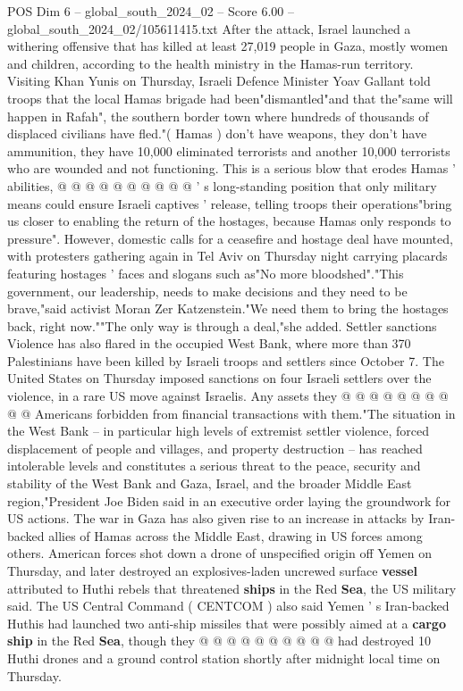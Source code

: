 \begin{textsample}{POS Dim 6 – global\_south\_2024\_02 – Score 6.00 – global\_south\_2024\_02/105611415.txt}
After the attack, Israel launched a withering offensive that has killed at least 27,019 people in Gaza, mostly women and children, according to the health ministry in the Hamas-run territory.
Visiting Khan Yunis on Thursday, Israeli Defence Minister Yoav Gallant told troops that the local Hamas brigade had been"dismantled"and that the"same will happen in Rafah", the southern border town where hundreds of thousands of displaced civilians have fled."( Hamas ) don't have weapons, they don't have ammunition, they have 10,000 eliminated terrorists and another 10,000 terrorists who are wounded and not functioning.
This is a serious blow that erodes Hamas ' abilities, @ @ @ @ @ @ @ @ @ @ ' s long-standing position that only military means could ensure Israeli captives ' release, telling troops their operations"bring us closer to enabling the return of the hostages, because Hamas only responds to pressure".
However, domestic calls for a ceasefire and hostage deal have mounted, with protesters gathering again in Tel Aviv on Thursday night carrying placards featuring hostages ' faces and slogans such as"No more bloodshed"."This government, our leadership, needs to make decisions and they need to be brave,"said activist Moran Zer Katzenstein."We need them to bring the hostages back, right now.""The only way is through a deal,"she added.
Settler sanctions Violence has also flared in the occupied West Bank, where more than 370 Palestinians have been killed by Israeli troops and settlers since October 7.
The United States on Thursday imposed sanctions on four Israeli settlers over the violence, in a rare US move against Israelis.
Any assets they @ @ @ @ @ @ @ @ @ @ Americans forbidden from financial transactions with them."The situation in the West Bank -- in particular high levels of extremist settler violence, forced displacement of people and villages, and property destruction -- has reached intolerable levels and constitutes a serious threat to the peace, security and stability of the West Bank and Gaza, Israel, and the broader Middle East region,"President Joe Biden said in an executive order laying the groundwork for US actions.
The war in Gaza has also given rise to an increase in attacks by Iran-backed allies of Hamas across the Middle East, drawing in US forces among others.
American forces shot down a drone of unspecified origin off Yemen on Thursday, and later destroyed an explosives-laden uncrewed surface \textbf{vessel} attributed to Huthi rebels that threatened \textbf{ships} in the Red \textbf{Sea}, the US military said.
The US Central Command ( CENTCOM ) also said Yemen ' s Iran-backed Huthis had launched two anti-ship missiles that were possibly aimed at a \textbf{cargo} \textbf{ship} in the Red \textbf{Sea}, though they @ @ @ @ @ @ @ @ @ @ had destroyed 10 Huthi drones and a ground control station shortly after midnight local time on Thursday.

\end{textsample}
